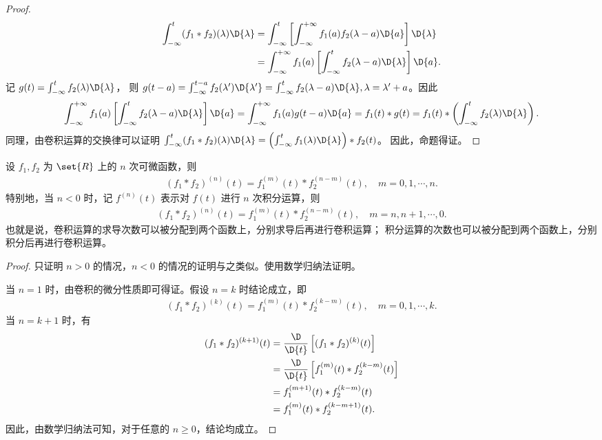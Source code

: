 \begin{proof}
    \begin{align*}
        \int_{-\infty}^{t}(f_1 * f_2)(\lambda)\D{\lambda}
        & = \int_{-\infty}^{t}\left[\int_{-\infty}^{+\infty}f_1(a)f_2(\lambda - a)\D{a}\right]\D{\lambda} \\
        & = \int_{-\infty}^{+\infty}f_1(a)\left[\int_{-\infty}^{t}f_2(\lambda - a)\D{\lambda}\right]\D{a}.
    \end{align*}
    记 $g(t) = \int_{-\infty}^{t}f_2(\lambda)\D{\lambda}$，
    则 $g(t - a) = \int_{-\infty}^{t - a}f_2(\lambda')\D{\lambda'} = \int_{-\infty}^{t}f_2(\lambda - a)\D{\lambda}, \lambda = \lambda' + a$。因此
    \begin{align*}
        \int_{-\infty}^{+\infty}f_1(a)\left[\int_{-\infty}^{t}f_2(\lambda - a)\D{\lambda}\right]\D{a}
        = \int_{-\infty}^{+\infty}f_1(a)g(t - a)\D{a}
        = f_1(t) * g(t)
        = f_1(t) * \left(\int_{-\infty}^{t}f_2(\lambda)\D{\lambda}\right).
    \end{align*}
    同理，由卷积运算的交换律可以证明 $\int_{-\infty}^{t}(f_1 * f_2)(\lambda)\D{\lambda} = \left(\int_{-\infty}^{t}f_1(\lambda)\D{\lambda}\right) * f_2(t)$。
    因此，命题得证。
\end{proof}

\begin{corollary}
    设 $f_1, f_2$ 为 $\set{R}$ 上的 $n$ 次可微函数，则
    \begin{align*}
        (f_1 * f_2)^{(n)}(t) = f_1^{(m)}(t) * f_2^{(n - m)}(t), \quad m = 0, 1, \cdots, n.
    \end{align*}
    特别地，当 $n < 0$ 时，记 $f^{(n)}(t)$ 表示对 $f(t)$ 进行 $n$ 次积分运算，则
    \begin{align*}
        (f_1 * f_2)^{(n)}(t) = f_1^{(m)}(t) * f_2^{(n - m)}(t), \quad m = n, n + 1, \cdots, 0.
    \end{align*}
    也就是说，卷积运算的求导次数可以被分配到两个函数上，分别求导后再进行卷积运算；
    积分运算的次数也可以被分配到两个函数上，分别积分后再进行卷积运算。
\end{corollary}

\begin{proof}
    只证明 $n > 0$ 的情况，$n < 0$ 的情况的证明与之类似。使用数学归纳法证明。
    
    当 $n = 1$ 时，由卷积的微分性质即可得证。假设 $n = k$ 时结论成立，即
    \begin{align*}
        (f_1 * f_2)^{(k)}(t) = f_1^{(m)}(t) * f_2^{(k - m)}(t), \quad m = 0, 1, \cdots, k.
    \end{align*}
    当 $n = k + 1$ 时，有
    \begin{align*}
        (f_1 * f_2)^{(k + 1)}(t) & = \frac{\D}{\D{t}}\left[(f_1 * f_2)^{(k)}(t)\right] \\
        & = \frac{\D}{\D{t}}\left[f_1^{(m)}(t) * f_2^{(k - m)}(t)\right] \\
        & = f_1^{(m + 1)}(t) * f_2^{(k - m)}(t) \\
        & = f_1^{(m)}(t) * f_2^{(k - m + 1)}(t).
    \end{align*}
    因此，由数学归纳法可知，对于任意的 $n \ge 0$，结论均成立。
\end{proof}


